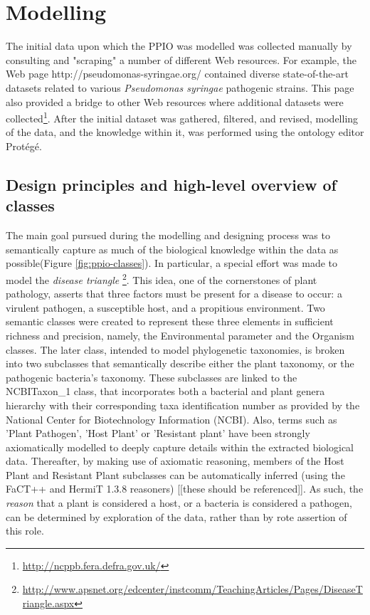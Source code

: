 \documentclass[sw]{iosart2c}
\newcommand{\myurl}[1]{\footnote{\url{#1}}}
\begin{document}



\section{Modelling}

The initial data upon which the PPIO was modelled was collected manually by consulting and "scraping" a number of different Web resources. For example, the Web page http://pseudomonas-syringae.org/ contained diverse state-of-the-art datasets related to various {\itshape Pseudomonas syringae} pathogenic strains. This page also provided a bridge to other Web resources where additional datasets were collected\myurl{http://ncppb.fera.defra.gov.uk/}. After the initial dataset was gathered, filtered, and revised, modelling of the data, and the knowledge within it, was performed using the ontology editor Prot\'eg\'e.

\subsection{Design principles and high-level overview of classes}

The main goal pursued during the modelling and designing process was to semantically capture as much of the biological knowledge within the data as possible(Figure \ref{fig:ppio-classes}). In particular, a special effort was made to model the {\itshape disease triangle} \myurl{http://www.apsnet.org/edcenter/instcomm/TeachingArticles/Pages/DiseaseTriangle.aspx}. This idea, one of the cornerstones of plant pathology, asserts that three factors must be present for a disease to occur: a virulent pathogen, a susceptible host, and a propitious environment. Two semantic classes were created to represent these three elements in sufficient richness and precision, namely, the {\sf Environmental parameter} and the {\sf Organism} classes. The later class, intended to model phylogenetic taxonomies, is broken into two subclasses that semantically describe either the plant taxonomy, or the pathogenic bacteria's taxonomy.  These subclasses are linked to the {\sf NCBITaxon\_1} class, that incorporates both a bacterial and plant genera hierarchy with their corresponding taxa identification number as provided by the National Center for Biotechnology Information (NCBI). Also, terms such as {\sf 'Plant Pathogen'}, {\sf 'Host Plant'} or {\sf 'Resistant plant'} have been strongly axiomatically modelled to deeply capture details within the extracted biological data.  Thereafter, by making use of axiomatic reasoning, members of the {\sf Host Plant} and {\sf Resistant Plant} subclasses can be automatically inferred (using the FaCT++ and HermiT 1.3.8 reasoners) [[these should be referenced]]. As such, the {\itshape reason} that a plant is considered a host, or a bacteria is considered a pathogen, can be determined by exploration of the data, rather than by rote assertion of this role.
\end{document}
